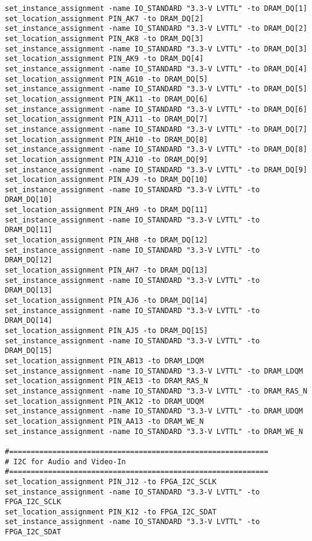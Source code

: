\documentclass[dvipdfm]{book}
\begin{document}
\begin{verbatim}
set_instance_assignment -name IO_STANDARD "3.3-V LVTTL" -to DRAM_DQ[1]
set_location_assignment PIN_AK7 -to DRAM_DQ[2]
set_instance_assignment -name IO_STANDARD "3.3-V LVTTL" -to DRAM_DQ[2]
set_location_assignment PIN_AK8 -to DRAM_DQ[3]
set_instance_assignment -name IO_STANDARD "3.3-V LVTTL" -to DRAM_DQ[3]
set_location_assignment PIN_AK9 -to DRAM_DQ[4]
set_instance_assignment -name IO_STANDARD "3.3-V LVTTL" -to DRAM_DQ[4]
set_location_assignment PIN_AG10 -to DRAM_DQ[5]
set_instance_assignment -name IO_STANDARD "3.3-V LVTTL" -to DRAM_DQ[5]
set_location_assignment PIN_AK11 -to DRAM_DQ[6]
set_instance_assignment -name IO_STANDARD "3.3-V LVTTL" -to DRAM_DQ[6]
set_location_assignment PIN_AJ11 -to DRAM_DQ[7]
set_instance_assignment -name IO_STANDARD "3.3-V LVTTL" -to DRAM_DQ[7]
set_location_assignment PIN_AH10 -to DRAM_DQ[8]
set_instance_assignment -name IO_STANDARD "3.3-V LVTTL" -to DRAM_DQ[8]
set_location_assignment PIN_AJ10 -to DRAM_DQ[9]
set_instance_assignment -name IO_STANDARD "3.3-V LVTTL" -to DRAM_DQ[9]
set_location_assignment PIN_AJ9 -to DRAM_DQ[10]
set_instance_assignment -name IO_STANDARD "3.3-V LVTTL" -to DRAM_DQ[10]
set_location_assignment PIN_AH9 -to DRAM_DQ[11]
set_instance_assignment -name IO_STANDARD "3.3-V LVTTL" -to DRAM_DQ[11]
set_location_assignment PIN_AH8 -to DRAM_DQ[12]
set_instance_assignment -name IO_STANDARD "3.3-V LVTTL" -to DRAM_DQ[12]
set_location_assignment PIN_AH7 -to DRAM_DQ[13]
set_instance_assignment -name IO_STANDARD "3.3-V LVTTL" -to DRAM_DQ[13]
set_location_assignment PIN_AJ6 -to DRAM_DQ[14]
set_instance_assignment -name IO_STANDARD "3.3-V LVTTL" -to DRAM_DQ[14]
set_location_assignment PIN_AJ5 -to DRAM_DQ[15]
set_instance_assignment -name IO_STANDARD "3.3-V LVTTL" -to DRAM_DQ[15]
set_location_assignment PIN_AB13 -to DRAM_LDQM
set_instance_assignment -name IO_STANDARD "3.3-V LVTTL" -to DRAM_LDQM
set_location_assignment PIN_AE13 -to DRAM_RAS_N
set_instance_assignment -name IO_STANDARD "3.3-V LVTTL" -to DRAM_RAS_N
set_location_assignment PIN_AK12 -to DRAM_UDQM
set_instance_assignment -name IO_STANDARD "3.3-V LVTTL" -to DRAM_UDQM
set_location_assignment PIN_AA13 -to DRAM_WE_N
set_instance_assignment -name IO_STANDARD "3.3-V LVTTL" -to DRAM_WE_N

#============================================================
# I2C for Audio and Video-In
#============================================================
set_location_assignment PIN_J12 -to FPGA_I2C_SCLK
set_instance_assignment -name IO_STANDARD "3.3-V LVTTL" -to FPGA_I2C_SCLK
set_location_assignment PIN_K12 -to FPGA_I2C_SDAT
set_instance_assignment -name IO_STANDARD "3.3-V LVTTL" -to FPGA_I2C_SDAT


\end{verbatim}
\end{document}
